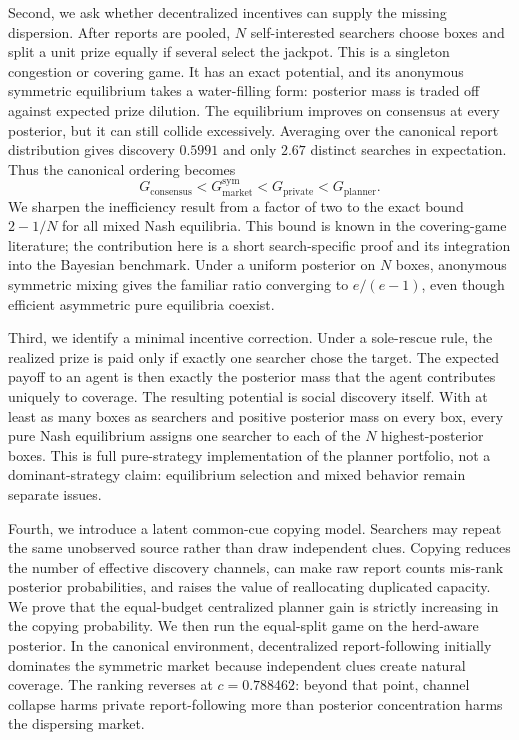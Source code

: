 \documentclass[11pt]{article}
\theoremstyle{definition}
\theoremstyle{remark}
\newcommand{\1}{\mathbf{1}}
\newcommand{\priv}{\mathrm{private}}
\newcommand{\cons}{\mathrm{consensus}}
\newcommand{\mkt}{\mathrm{market}}
\newcommand{\plan}{\mathrm{planner}}
\begin{document}
Second, we ask whether decentralized incentives can supply the missing dispersion. After reports are pooled, $N$ self-interested searchers choose boxes and split a unit prize equally if several select the jackpot. This is a singleton congestion or covering game. It has an exact potential, and its anonymous symmetric equilibrium takes a water-filling form: posterior mass is traded off against expected prize dilution. The equilibrium improves on consensus at every posterior, but it can still collide excessively. Averaging over the canonical report distribution gives discovery $0.5991$ and only $2.67$ distinct searches in expectation. Thus the canonical ordering becomes
\[
G_{\cons}<G_{\mkt}^{\mathrm{sym}}<G_{\priv}<G_{\plan}.
\]
We sharpen the inefficiency result from a factor of two to the exact bound $2-1/N$ for all mixed Nash equilibria. This bound is known in the covering-game literature; the contribution here is a short search-specific proof and its integration into the Bayesian benchmark. Under a uniform posterior on $N$ boxes, anonymous symmetric mixing gives the familiar ratio converging to $e/(e-1)$, even though efficient asymmetric pure equilibria coexist.

Third, we identify a minimal incentive correction. Under a sole-rescue rule, the realized prize is paid only if exactly one searcher chose the target. The expected payoff to an agent is then exactly the posterior mass that the agent contributes uniquely to coverage. The resulting potential is social discovery itself. With at least as many boxes as searchers and positive posterior mass on every box, every pure Nash equilibrium assigns one searcher to each of the $N$ highest-posterior boxes. This is full pure-strategy implementation of the planner portfolio, not a dominant-strategy claim: equilibrium selection and mixed behavior remain separate issues.

Fourth, we introduce a latent common-cue copying model. Searchers may repeat the same unobserved source rather than draw independent clues. Copying reduces the number of effective discovery channels, can make raw report counts mis-rank posterior probabilities, and raises the value of reallocating duplicated capacity. We prove that the equal-budget centralized planner gain is strictly increasing in the copying probability. We then run the equal-split game on the herd-aware posterior. In the canonical environment, decentralized report-following initially dominates the symmetric market because independent clues create natural coverage. The ranking reverses at $c=0.788462$: beyond that point, channel collapse harms private report-following more than posterior concentration harms the dispersing market.
\end{document}
